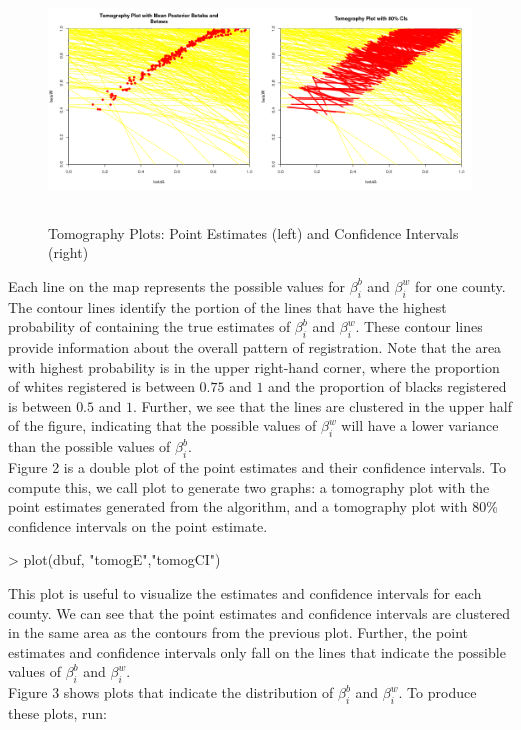 \documentclass[11pt,oneside,letterpaper,titlepage]{article}
\begin{document}
\begin{figure}[h]
\begin{center}
\includegraphics[width=7.5in, height=2.5in,   viewport=0 0 1400 395,clip]{tomogplot2.png} 
\end{center}
\caption{Tomography Plots: Point Estimates (left) and Confidence
  Intervals (right)}
\label{fig:tomog2}
\end{figure}

\noindent Each line on the map represents the possible values for $\beta_i^b$ and $\beta_i^w$ for one county.  The contour lines identify the portion of the lines that have the highest probability of containing the true estimates of $\beta_i^b$ and $\beta_i^w$.  These contour lines provide information about the overall pattern of registration.  Note that the area with highest probability is in the upper right-hand corner, where the proportion of whites registered is between $0.75$ and $1$ and the proportion of blacks registered is between $0.5$ and $1$.  Further, we see that the lines are clustered in the upper half of the figure, indicating that the possible values of $\beta_i^w$ will have a lower variance than the possible values of $\beta_i^b$.\\
\newline
Figure 2 is a double plot of the point estimates and their confidence intervals.  To compute this, we call plot to generate two graphs: a tomography plot with the point estimates generated from the algorithm, and a tomography plot with 80\% confidence intervals on the point estimate.  

\begin{Schunk}
\begin{Sinput}
> plot(dbuf, "tomogE","tomogCI")
\end{Sinput}
\end{Schunk}

\noindent This plot is useful to visualize the estimates and confidence intervals for each county.  We can see that the point estimates and confidence intervals are clustered in the same area as the contours from the previous plot.  Further, the point estimates and confidence intervals only fall on the lines that indicate the possible values of $\beta_i^b$ and $\beta_i^w$.\\
\newline
Figure 3 shows plots that indicate the distribution of $\beta_i^b$ and $\beta_i^w$. To produce these plots, run:
\end{document}
